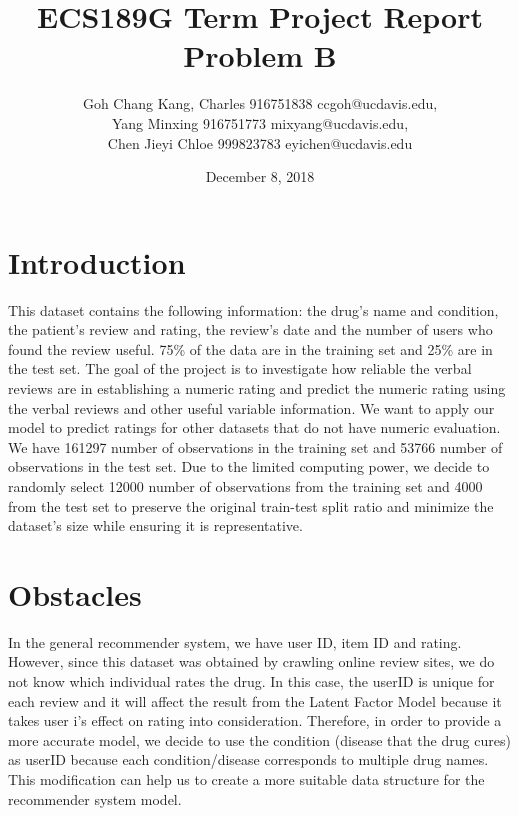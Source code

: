 \documentclass{article}
\begin{document}
\begin{titlepage}
\title{ECS189G Term Project Report Problem B}
\author{Goh Chang Kang, Charles 916751838 ccgoh@ucdavis.edu, \\
Yang Minxing 916751773 mixyang@ucdavis.edu, \\ 
Chen Jieyi Chloe 999823783 eyichen@ucdavis.edu}

\date{December 8, 2018}
\maketitle
\end{titlepage}

\tableofcontents

\pagebreak

\section{Introduction}

This dataset contains the following information: the drug’s name and condition, 
the patient’s review and rating, the review’s date and the number of users 
who found the review useful. 75\% of the data are in the training set and 
25\% are in the test set. The goal of the project is to investigate how 
reliable the verbal reviews are in establishing a numeric rating and predict 
the numeric rating using the verbal reviews and other useful variable 
information. We want to apply our model to predict ratings for other 
datasets that do not have numeric evaluation. We have 161297 number of 
observations in the training set and 53766 number of observations in the 
test set. Due to the limited computing power, we decide to randomly select 
12000 number of observations from the training set and 4000 from the test 
set to preserve the original train-test split ratio and minimize the 
dataset’s size while ensuring it is representative. 

\section{Obstacles}
In the general recommender system, we have user ID, item ID and rating. 
However, since this dataset was obtained by crawling online review sites, 
we do not know which individual rates the drug. In this case, the userID 
is unique for each review and it will affect the result from the Latent 
Factor Model because it takes user i’s effect on rating into consideration. 
Therefore, in order to provide a more accurate model, we decide to use the 
condition (disease that the drug cures) as userID because each 
condition/disease corresponds to multiple drug names. This modification 
can help us to create a more suitable data structure for the recommender 
system model.
\end{document}
